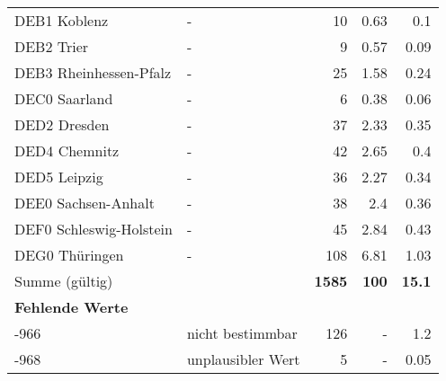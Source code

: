 \begin{longtable}{Xlrrr}
        \multicolumn{1}{X}{DEB1 Koblenz} & - & \num{10} & \num[round-mode=places,round-precision=2]{0.63} & \num[round-mode=places,round-precision=2]{0.1} \\
        \multicolumn{1}{X}{DEB2 Trier} & - & \num{9} & \num[round-mode=places,round-precision=2]{0.57} & \num[round-mode=places,round-precision=2]{0.09} \\
        \multicolumn{1}{X}{DEB3 Rheinhessen-Pfalz} & - & \num{25} & \num[round-mode=places,round-precision=2]{1.58} & \num[round-mode=places,round-precision=2]{0.24} \\
        \multicolumn{1}{X}{DEC0 Saarland} & - & \num{6} & \num[round-mode=places,round-precision=2]{0.38} & \num[round-mode=places,round-precision=2]{0.06} \\
        \multicolumn{1}{X}{DED2 Dresden} & - & \num{37} & \num[round-mode=places,round-precision=2]{2.33} & \num[round-mode=places,round-precision=2]{0.35} \\
        \multicolumn{1}{X}{DED4 Chemnitz} & - & \num{42} & \num[round-mode=places,round-precision=2]{2.65} & \num[round-mode=places,round-precision=2]{0.4} \\
        \multicolumn{1}{X}{DED5 Leipzig} & - & \num{36} & \num[round-mode=places,round-precision=2]{2.27} & \num[round-mode=places,round-precision=2]{0.34} \\
        \multicolumn{1}{X}{DEE0 Sachsen-Anhalt} & - & \num{38} & \num[round-mode=places,round-precision=2]{2.4} & \num[round-mode=places,round-precision=2]{0.36} \\
        \multicolumn{1}{X}{DEF0 Schleswig-Holstein} & - & \num{45} & \num[round-mode=places,round-precision=2]{2.84} & \num[round-mode=places,round-precision=2]{0.43} \\
        \multicolumn{1}{X}{DEG0 Thüringen} & - & \num{108} & \num[round-mode=places,round-precision=2]{6.81} & \num[round-mode=places,round-precision=2]{1.03} \\
     \midrule
      \multicolumn{2}{l}{Summe (gültig)} & \textbf{\num{1585}} &
      \textbf{\num{100}} &
         \textbf{\num[round-mode=places,round-precision=2]{15.1}} \\
     \multicolumn{5}{l}{\textbf{Fehlende Werte}}\\
       -966 & nicht bestimmbar & \num{126} & - & \num[round-mode=places,round-precision=2]{1.2} \\

       -968 & unplausibler Wert & \num{5} & - & \num[round-mode=places,round-precision=2]{0.05} \\


\end{longtable}
